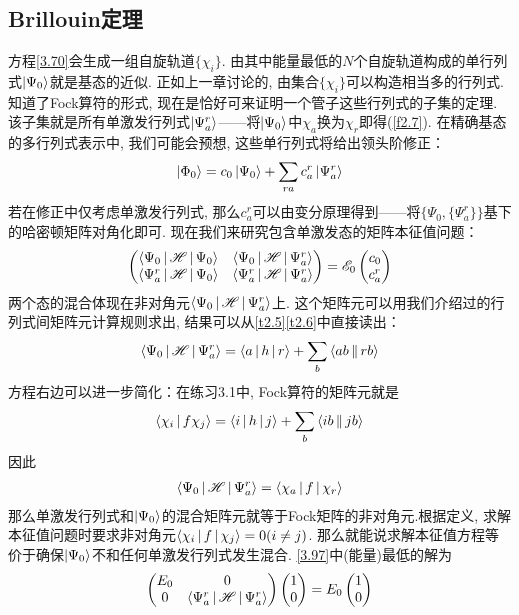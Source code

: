 \subsection{Brillouin定理}
\hft 方程\eqref{3.70}会生成一组自旋轨道$\{\chi_i\}$. 由其中能量最低的$N$个自旋轨道构成的单行列式$\Ket{\Psi_0}$就是基态的\hft 近似. 正如上一章讨论的, 由集合$\{\chi_i\}$可以构造相当多的行列式. 知道了Fock算符的形式, 现在是恰好可来证明一个管子这些行列式的子集的定理. 该子集就是所有单激发行列式$\Ket{\Psi_a^r}$——将$\Ket{\Psi_0}$中$\chi_a$换为$\chi_r$即得(\ref{f2.7}). 在精确基态的多行列式表示中, 我们可能会预想, 这些单行列式将给出领头阶修正：
\begin{align}
\Ket{\Phi_0} = c_0\Ket{\Psi_0} + \sum_{ra}c_a^r\Ket{\Psi_a^r}
\end{align}
若在修正中仅考虑单激发行列式, 那么$c_a^r$可以由变分原理得到——将$\{\Psi_0,\{\Psi_a^r\}\}$基下的哈密顿矩阵对角化即可. 现在我们来研究包含单激发态的矩阵本征值问题：
\begin{align}
\label{3.97}
\begin{pmatrix}
\Braket{\Psi_0|\mathscr{H}|\Psi_0} & \Braket{\Psi_0|\mathscr{H}|\Psi_a^r}\\
\Braket{\Psi_a^r|\mathscr{H}|\Psi_0} & \Braket{\Psi_a^r|\mathscr{H}|\Psi_a^r}\\
\end{pmatrix}
=\mathscr{E}_0
\begin{pmatrix}
c_0\\
c_a^r
\end{pmatrix}
\end{align}
两个态的混合体现在非对角元$\Braket{\Psi_0|\mathscr{H}|\Psi_a^r}$上. 这个矩阵元可以用我们介绍过的行列式间矩阵元计算规则求出, 结果可以从\ref{t2.5}\ref{t2.6}中直接读出：
\begin{align}
\Braket{\Psi_0|\mathscr{H}|\Psi_a^r} = \Braket{a|h|r} + \sum_b\Braket{ab||rb}
\end{align}
方程右边可以进一步简化：在练习3.1中, Fock算符的矩阵元就是
\begin{align}
\Braket{\chi_i|f\chi_j} = \Braket{i|h|j} + \sum_b\Braket{ib||jb}
\end{align} 
因此
\begin{align}
\Braket{\Psi_0|\mathscr{H}|\Psi_a^r} = \Braket{\chi_a|f|\chi_r}
\end{align}
那么单激发行列式和$\Ket{\Psi_0}$的混合矩阵元就等于Fock矩阵的非对角元.根据定义, 求解\hft 本征值问题时要求非对角元$\Braket{\chi_i|f|\chi_j}=0(i\neq j)$. 那么就能说求解\hft 本征值方程等价于确保$\Ket{\Psi_0}$不和任何单激发行列式发生混合. \eqref{3.97}中(能量)最低的解为
\begin{align}
\begin{pmatrix}
E_0 & 0\\
0   & \Braket{\Psi_a^r|\mathscr{H}|\Psi_a^r}
\end{pmatrix}
\begin{pmatrix}
1\\0
\end{pmatrix}
=E_0
\begin{pmatrix}
1\\0
\end{pmatrix}
\end{align}
